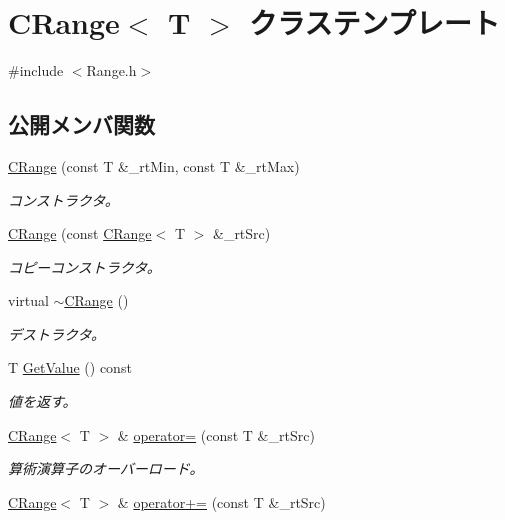 \hypertarget{class_c_range}{}\section{C\+Range$<$ T $>$ クラステンプレート}
\label{class_c_range}


{\ttfamily \#include $<$Range.\+h$>$}

\subsection*{公開メンバ関数}
\begin{DoxyCompactItemize}
\item 
\hyperlink{class_c_range_a1db083cfad9ecd7bb7f44f81a3d2064c}{C\+Range} (const T \&\+\_\+rt\+Min, const T \&\+\_\+rt\+Max)
\begin{DoxyCompactList}\small\item\em コンストラクタ。 \end{DoxyCompactList}\item 
\hyperlink{class_c_range_a844253ef9aa9b5cda7fe685a28832be7}{C\+Range} (const \hyperlink{class_c_range}{C\+Range}$<$ T $>$ \&\+\_\+rt\+Src)
\begin{DoxyCompactList}\small\item\em コピーコンストラクタ。 \end{DoxyCompactList}\item 
virtual \hyperlink{class_c_range_ac79b7d48f29fe5a15cbcc9b6ac8f162c}{$\sim$\+C\+Range} ()
\begin{DoxyCompactList}\small\item\em デストラクタ。 \end{DoxyCompactList}\item 
T \hyperlink{class_c_range_ae935dd30669959647bf0484a54d26b63}{Get\+Value} () const 
\begin{DoxyCompactList}\small\item\em 値を返す。 \end{DoxyCompactList}\item 
\hyperlink{class_c_range}{C\+Range}$<$ T $>$ \& \hyperlink{class_c_range_a74ca9bd04053c9933cc17522b7f666a7}{operator=} (const T \&\+\_\+rt\+Src)
\begin{DoxyCompactList}\small\item\em 算術演算子のオーバーロード。 \end{DoxyCompactList}\item 
\hyperlink{class_c_range}{C\+Range}$<$ T $>$ \& \hyperlink{class_c_range_a1037034ac40b3e904ccf722911a3c68d}{operator+=} (const T \&\+\_\+rt\+Src)

\end{DoxyCompactItemize}
